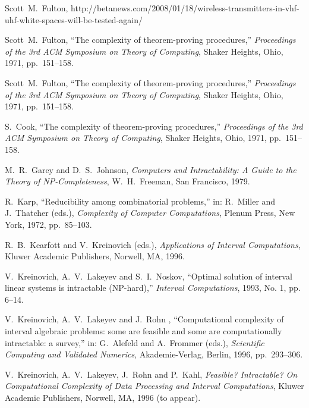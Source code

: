 
\begin{thereferences}{99}

Scott~M.~Fulton,
http://betanews.com/2008/01/18/wireless-transmitters-in-vhf-uhf-white-spaces-will-be-tested-again/

Scott~M.~Fulton,
 ``The complexity of theorem-proving procedures,''
 {\it Proceedings of the 3rd ACM Symposium on Theory of Computing},
 Shaker Heights, Ohio, 1971, pp.~151--158.

Scott~M.~Fulton,
 ``The complexity of theorem-proving procedures,''
 {\it Proceedings of the 3rd ACM Symposium on Theory of Computing},
 Shaker Heights, Ohio, 1971, pp.~151--158.
 
S.~Cook,
 ``The complexity of theorem-proving procedures,''
 {\it Proceedings of the 3rd ACM Symposium on Theory of Computing},
 Shaker Heights, Ohio, 1971, pp.~151--158.

M.~R.~Garey and D.~S.~Johnson,
 {\it Computers and Intractability: A Guide to the Theory of\/
 {\rm NP}-Completeness},
 W.~H.~Freeman, San Francisco, 1979.

R.~Karp,
 ``Reducibility among combinatorial problems,''
 in: R.~Miller and J.~Thatcher (eds.),
 {\it Complexity of Computer Computations},
 Plenum Press, New York, 1972, pp.~85--103.

R.~B.~Kearfott and V.~Kreinovich (eds.),
 {\it Applications of Interval Computations},
 Kluwer Academic Publishers, Norwell, MA, 1996.

V.~Kreinovich, A.~V.~Lakeyev and S.~I.~Noskov,
 ``Optimal solution of interval linear systems is intractable (NP-hard),''
 {\it Interval Computations},
 1993, No. 1, pp. 6--14.

 V.~Kreinovich, A.~V.~Lakeyev and J.~Rohn ,
 ``Computational complexity of interval algebraic problems: some are feasible
 and some are computationally intractable: a survey,''
 in: G.~Alefeld and A.~Frommer (eds.),
 {\it Scientific Computing and Validated Numerics},
 Akademie-Verlag, Berlin, 1996, pp.~293--306.

 V.~Kreinovich, A.~V.~Lakeyev, J.~Rohn and P.~Kahl,
 {\it Feasible? Intractable? On Computational Complexity of Data Processing
 and Interval Computations},
 Kluwer Academic Publishers, Norwell, MA, 1996 (to appear).


\end{thereferences}
